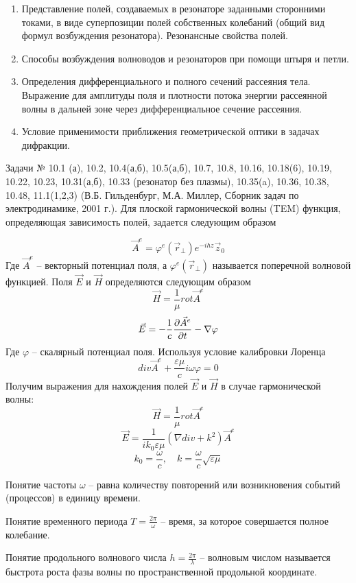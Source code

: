 \documentclass[a4paper,14pt]{extarticle}
\renewcommand{\phi}{\varphi}
\renewcommand{\epsilon}{\varepsilon}
\begin{document}
\begin{enumerate}
		\item 
		Представление полей, создаваемых в резонаторе заданными сторонними токами, в виде суперпозиции полей собственных колебаний (общий вид формул возбуждения резонатора). Резонансные свойства полей.
		\item 
		Способы возбуждения волноводов и резонаторов при помощи штыря и петли.
		\item 
		Определения дифференциального и полного сечений рассеяния тела. Выражение для амплитуды поля и плотности потока энергии рассеянной волны в дальней зоне через дифференциальное сечение рассеяния.
		\item 
		Условие применимости приближения геометрической оптики в задачах дифракции.
		
	\end{enumerate}
	
	Задачи № 10.1 (а), 10.2, 10.4(а,б), 10.5(а,б), 10.7, 10.8, 10.16, 10.18(6), 10.19, 10.22, 10.23, 10.31(а,б), 10.33 (резонатор без плазмы), 10.35(a), 10.36, 10.38, 10.48, 11.1(1,2,3)
	(В.Б. Гильденбург, М.А. Миллер, Сборник задач по электродинамике, 2001 г.).
	\newpage
	\hypertarget{num1}{}
	Для плоской гармонической волны (TEM) функция, определяющая зависимость полей, задается следующим образом 
	
	$$\vec{A}^e = \phi^e(\vec{r}_\perp)e^{-ihz}\vec{z}_0$$
	Где $\vec{A}^e$ -- векторный потенциал поля, а $\phi^e(\vec{r}_\perp)$ называется поперечной волновой функцией. Поля $\vec{E}$ и $\vec{H}$ определяются следующим образом
	$$\vec{H}=\frac{1}{\mu} rot\vec{A}^e $$
	$$\vec{E}=-\frac{1}{c} \pdv{\vec{A}^e}{t}-\nabla{\phi} $$
	Где $\phi$ -- скалярный потенциал поля. 
	Используя условие калибровки Лоренца
	$$div\vec{A}^e+\frac{\epsilon\mu}{c}i\omega\phi=0$$
	Получим выражения для нахождения полей $\vec{E}$ и $\vec{H}$ в случае гармонической волны:
	$$\vec{H}=\frac{1}{\mu} rot\vec{A}^e $$
	$$\vec{E}=\frac{1}{i k_0\epsilon\mu}(\nabla div + k^2)\vec{A}^e $$
	$$k_0=\frac{\omega}{c}, \quad k=\frac{\omega}{c}\sqrt{\epsilon\mu}$$
	
	Понятие частоты $\omega$ -- равна количеству повторений или возникновения событий (процессов) в единицу времени.
	
	Понятие временного периода $T = \frac{2\pi}{\omega}$ -- время, за которое совершается полное колебание.
	
	Понятие продольного волнового числа $h=\frac{2\pi}{\lambda}$ -- волновым числом  называется быстрота роста фазы волны по пространственной продольной координате.
	
\end{document}
